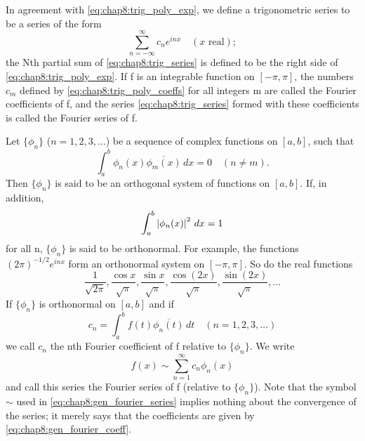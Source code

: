 \begin{definition}
  In agreement with \eqref{eq:chap8:trig_poly_exp}, we define a
  trigonometric series to be a series of the form
  \begin{equation} \label{eq:chap8:trig_series}
    \sum_{n=-\infty}^\infty c_n e^{inx} \quad (x \text{ real});
  \end{equation}
  the Nth partial sum of \eqref{eq:chap8:trig_series} is defined to
  be the right side of \eqref{eq:chap8:trig_poly_exp}.
  If f is an integrable function on $[-\pi, \pi]$, the numbers $c_m$
  defined by \eqref{eq:chap8:trig_poly_coeffs} for all integers m are
  called the Fourier coefficients of f, and the series
  \eqref{eq:chap8:trig_series} formed with these coefficients is
  called the Fourier series of f.
\end{definition}


\begin{definition} %
  \label{def:chap8:orthogonal_systems}
  Let $\{\phi_n\}$ ($n=1, 2, 3, \dots$) be a sequence of complex
  functions on $[a, b]$, such that
  \begin{equation} \label{eq:chap8:orthogonality_condition}
    \int_a^b \phi_n(x) \overline{\phi_m(x)} \, dx = 0 \quad (n \ne m).
  \end{equation}
  Then $\{\phi_n\}$ is said to be an orthogonal system of functions
  on $[a, b]$. If, in addition,
  \begin{equation} \label{eq:chap8:orthonormality_condition}
    \int_a^b \left\lvert \phi_n(x) \right\rvert^2 \, dx = 1
  \end{equation}
  for all n, $\{\phi_n\}$ is said to be orthonormal.
  For example, the functions $(2\pi)^{-1/2} e^{inx}$ form an
  orthonormal system on $[-\pi, \pi]$. So do the real functions
  \[ \frac{1}{\sqrt{2\pi}}, \frac{\cos x}{\sqrt{\pi}}, \frac{\sin
    x}{\sqrt{\pi}}, \frac{\cos(2x)}{\sqrt{\pi}},
  \frac{\sin(2x)}{\sqrt{\pi}}, \dots \]
  If $\{\phi_n\}$ is orthonormal on $[a, b]$ and if
  \begin{equation} \label{eq:chap8:gen_fourier_coeff}
    c_n = \int_a^b f(t) \overline{\phi_n(t)} \, dt \quad (n=1, 2, 3, \dots)
  \end{equation}
  we call $c_n$ the nth Fourier coefficient of f relative to
  $\{\phi_n\}$. We write
  \begin{equation} \label{eq:chap8:gen_fourier_series}
    f(x) \sim \sum_{n=1}^\infty c_n \phi_n(x)
  \end{equation}
  and call this series the Fourier series of f (relative to
  $\{\phi_n\}$). Note that the symbol $\sim$ used in
  \eqref{eq:chap8:gen_fourier_series} implies nothing about the
  convergence of the series; it merely says that the coefficients are
  given by \eqref{eq:chap8:gen_fourier_coeff}.
\end{definition}


